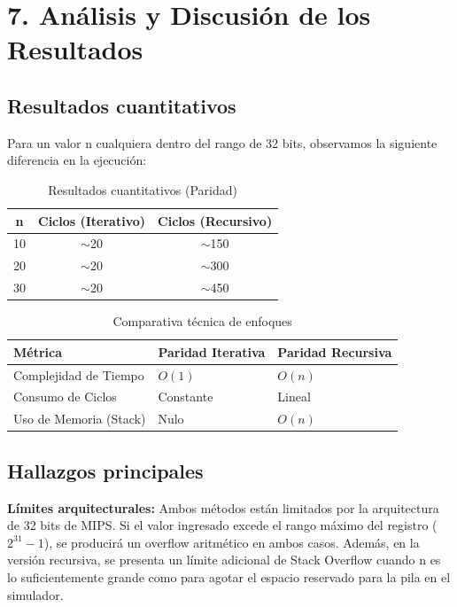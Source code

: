\documentclass[12pt]{article}
\begin{document}
\section*{7. Análisis y Discusión de los Resultados}

\subsection*{Resultados cuantitativos}

Para un valor n cualquiera dentro del rango de 32 bits, observamos la siguiente diferencia en la ejecución:

\begin{table}[h]
\centering
\caption{Resultados cuantitativos (Paridad)}
\begin{tabular}{|c|c|c|}
\hline
\textbf{n} & \textbf{Ciclos (Iterativo)} & \textbf{Ciclos (Recursivo)} \\ \hline
10 & $\sim$20 & $\sim$150 \\ \hline
20 & $\sim$20 & $\sim$300 \\ \hline
30 & $\sim$20 & $\sim$450 \\ \hline
\end{tabular}
\end{table}

\vspace{0.5cm}

\begin{table}[h]
\centering
\caption{Comparativa técnica de enfoques}
\begin{tabular}{|l|l|l|}
\hline
\textbf{Métrica} & \textbf{Paridad Iterativa} & \textbf{Paridad Recursiva} \\ \hline
Complejidad de Tiempo & $O(1)$ & $O(n)$ \\ \hline
Consumo de Ciclos & Constante & Lineal \\ \hline
Uso de Memoria (Stack) & Nulo & $O(n)$ \\ \hline
\end{tabular}
\end{table}

\subsection*{Hallazgos principales}

\textbf{Límites arquitecturales:} Ambos métodos están limitados por la arquitectura de 32 bits de MIPS. Si el valor ingresado excede el rango máximo del registro ($2^{31} - 1$), se producirá un overflow aritmético en ambos casos. Además, en la versión recursiva, se presenta un límite adicional de Stack Overflow cuando n es lo suficientemente grande como para agotar el espacio reservado para la pila en el simulador.
\end{document}
